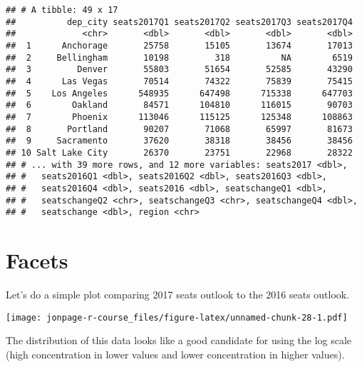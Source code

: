 \documentclass[]{book}
\newenvironment{Shaded}{\begin{snugshade}}{\end{snugshade}}
\newcommand{\KeywordTok}[1]{\textcolor[rgb]{0.13,0.29,0.53}{\textbf{{#1}}}}
\newcommand{\DataTypeTok}[1]{\textcolor[rgb]{0.13,0.29,0.53}{{#1}}}
\newcommand{\DecValTok}[1]{\textcolor[rgb]{0.00,0.00,0.81}{{#1}}}
\newcommand{\StringTok}[1]{\textcolor[rgb]{0.31,0.60,0.02}{{#1}}}
\newcommand{\CommentTok}[1]{\textcolor[rgb]{0.56,0.35,0.01}{\textit{{#1}}}}
\newcommand{\NormalTok}[1]{{#1}}
\theoremstyle{definition}
\theoremstyle{definition}
\theoremstyle{remark}
\begin{document}
\begin{verbatim}
## # A tibble: 49 x 17
##          dep_city seats2017Q1 seats2017Q2 seats2017Q3 seats2017Q4
##             <chr>       <dbl>       <dbl>       <dbl>       <dbl>
##  1      Anchorage       25758       15105       13674       17013
##  2     Bellingham       10198         318          NA        6519
##  3         Denver       55803       51654       52585       43290
##  4      Las Vegas       70514       74322       75839       75415
##  5    Los Angeles      548935      647498      715338      647703
##  6        Oakland       84571      104810      116015       90703
##  7        Phoenix      113046      115125      125348      108863
##  8       Portland       90207       71068       65997       81673
##  9     Sacramento       37620       38318       38456       38456
## 10 Salt Lake City       26370       23751       22968       28322
## # ... with 39 more rows, and 12 more variables: seats2017 <dbl>,
## #   seats2016Q1 <dbl>, seats2016Q2 <dbl>, seats2016Q3 <dbl>,
## #   seats2016Q4 <dbl>, seats2016 <dbl>, seatschangeQ1 <dbl>,
## #   seatschangeQ2 <chr>, seatschangeQ3 <chr>, seatschangeQ4 <dbl>,
## #   seatschange <dbl>, region <chr>
\end{verbatim}

\section{Facets}\label{facets}

Let's do a simple plot comparing 2017 seats outlook to the 2016 seats
outlook.

\begin{Shaded}
\end{Shaded}

\texttt{[image: jonpage-r-course\_files/figure-latex/unnamed-chunk-28-1.pdf]}

The distribution of this data looks like a good candidate for using the
log scale (high concentration in lower values and lower concentration in
higher values).

\begin{Shaded}
\end{Shaded}
\end{document}
